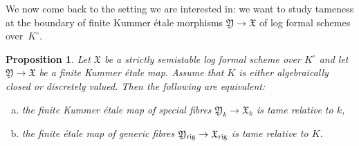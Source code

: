 \documentclass[a4paper,twoside,11pt,reqno]{amsart}
\newcommand{\fX}{{\mathfrak{X}}}
\newcommand{\fY}{{\mathfrak{Y}}}
\newcommand{\rig}{{\rm rig}}
\newtheorem{prop}[thm]{Proposition}
\theoremstyle{definition}
\numberwithin{equation}{subsection}
\begin{document}
We now come back to the setting we are interested in:
we want to study tameness at the boundary of finite Kummer étale morphisms $\fY \to \fX$ of log formal schemes over~$K^\circ$.

\begin{prop} \label{prop:tameness-comparison}
    Let $\fX$ be a strictly semistable log formal scheme over $K^\circ$ and let $\fY\to\fX$ be a finite Kummer \'etale map.  Assume that $K$ is either algebraically closed or discretely valued. 
 Then the following are equivalent:
    \begin{enumerate}[(a)]
        \item the finite Kummer \'etale map of special fibres $\fY_k\to \fX_k$ is tame relative to $k$,
    
        \item the finite \'etale map of generic fibres $\fY_\rig\to\fX_\rig$ is tame relative to $K$.
    \end{enumerate}
\end{prop}
\end{document}

